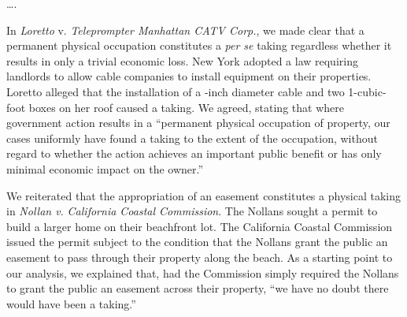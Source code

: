 \ldots.

%
%
%
In \textit{Loretto} v. \textit{Teleprompter Manhattan CATV Corp.}, we made clear
that a permanent physical occupation constitutes a \textit{per se} taking
regardless whether it results in only a trivial economic loss. New York adopted
a law requiring landlords to allow cable companies to install equipment on their
properties. Loretto alleged that the installation of a {\textonehalf}-inch
diameter cable and two 1{\textonehalf}-cubic-foot boxes on her roof caused a
taking. We agreed, stating that where government action results in a ``permanent
physical occupation of property, our cases uniformly have found a taking to the
extent of the occupation, without regard to whether the action achieves an
important public benefit or has only minimal economic impact on the owner.''


We reiterated that the appropriation of an easement constitutes a physical
taking in \textit{Nollan v.} \textit{California Coastal Commission}. The Nollans
sought a permit to build a larger home on their beachfront lot. The California
Coastal Commission issued the permit subject to the condition that the Nollans
grant the public an easement to pass through their property along the beach. As
a starting point to our analysis, we explained that, had the Commission simply
required the Nollans to grant the public an easement across their property, ``we
have no doubt there would have been a taking.'' 


